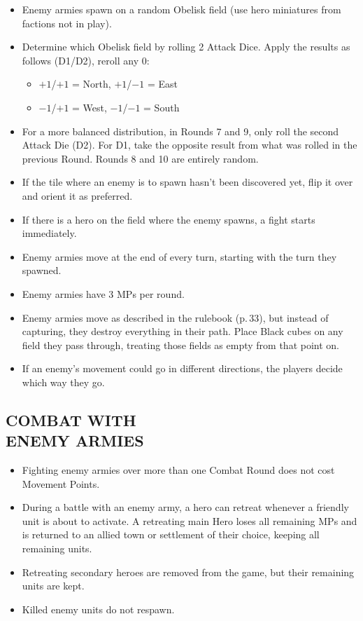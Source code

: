 \begin{multicols}{2}
\begin{itemize}
  \item Enemy armies spawn on a random Obelisk field (use hero miniatures from factions not in play).
  \item Determine which Obelisk field by rolling 2 Attack Dice. Apply the results as follows (D1/D2), reroll any 0:
  \begin{itemize}[leftmargin=15pt]
    \item[] $+1$/$+1$ = North, $+1$/$-1$ = East
    \item[] $-1$/$+1$ = West, $-1$/$-1$ = South
  \end{itemize}
  \item For a more balanced distribution, in Rounds 7 and 9, only roll the second Attack Die (D2). For D1, take the opposite result from what was rolled in the previous Round.
  Rounds 8 and 10 are entirely random.
  \item If the tile where an enemy is to spawn hasn't been discovered yet, flip it over and orient it as preferred.
  \item If there is a hero on the field where the enemy spawns, a fight starts immediately.
  \item Enemy armies move at the end of every turn, starting with the turn they spawned.
  \item Enemy armies have 3 MPs per round.
  \item Enemy armies move as described in the rulebook (p.\,33), but instead of capturing, they destroy everything in their path.
    Place Black cubes on any field they pass through, treating those fields as empty from that point on.
  \item If an enemy's movement could go in different directions, the players decide which way they go.
\end{itemize}

\subsection*{\MakeUppercase{Combat with\\Enemy Armies}}

\begin{itemize}
  \item Fighting enemy armies over more than one Combat Round does not cost Movement Points.
  \item During a battle with an enemy army, a hero can retreat whenever a friendly unit is about to activate.
    A retreating main Hero loses all remaining MPs and is returned to an allied town or settlement of their choice, keeping all remaining units.
  \item Retreating secondary heroes are removed from the game, but their remaining units are kept.
  \item Killed enemy units do not respawn.
\end{itemize}


\end{multicols}
